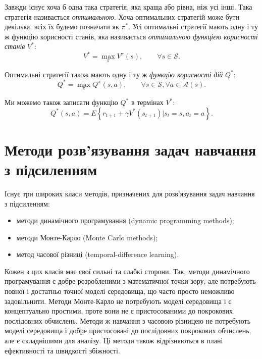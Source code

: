 Завжди існує хоча б одна така стратегія, яка краща або рівна, ніж усі інші. Така стратегія називається \emph{оптимальною}. Хоча оптимальних стратегій може бути декілька, всіх їх будемо позначати як $\pi^*$. Усі оптимальні стратегії мають одну і ту ж функцію корисності станів, яка називається \emph{оптимальною функцією корисності станів} $V^*$:
\begin{equation}
V^* = \max_\pi V^\pi(s),\qquad \forall s \in \mathcal{S}.
\end{equation}

Оптимальні стратегії також мають одну і ту ж \emph{функцію корисності дій} $Q^*$:
\begin{equation}
Q^* = \max_\pi Q^\pi(s,a),\qquad \forall s \in \mathcal{S}, \forall a \in \mathcal{A}(s).
\end{equation}

Ми можемо також записати функцію $Q^*$ в термінах $V^*$:
\begin{equation}
Q^*(s,a) = E\left\{r_{t+1} + \gamma V^*(s_{t+1}) \Big| s_t=s, a_t=a \right\}.
\end{equation}

\section{Методи розв'язування задач навчання з підсиленням}

Існує три широких класи методів, призначених для розв'язування задач навчання з підсиленням:
\begin{itemize}
\item методи динамічного програмування (dynamic programming methods);
\item методи Монте-Карло (Monte Carlo methods);
\item метод часової різниці (temporal-difference learning).
\end{itemize}

Кожен з цих класів має свої сильні та слабкі сторони. Так, методи динамічного програмування є добре розробленими з математичної точки зору, але потребують повної і достатньо точної моделі середовища, що часто просто неможливо задовільнити. Методи Монте-Карло не потребують моделі середовища і є концептуально простими, проте вони не є пристосованими до покрокових послідовних обчислень. Методи ж навчання з часовою різницею не потребують моделі середовища і добре пристосовані до послідовних покрокових обчислень, але є складнішими для аналізу. Ці методи також відрізняються в плані ефективності та швидкості збіжності.

